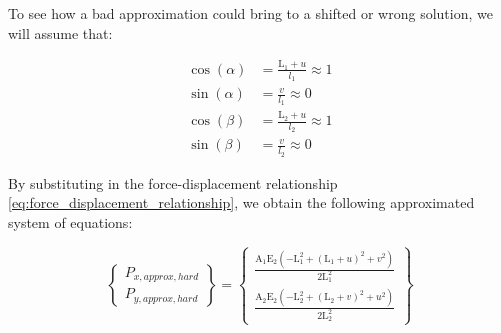To see how a bad approximation could bring to a shifted or wrong solution, we will assume that:

\begin{align}
    \cos(\alpha) & = \frac{\text{L}_1+u}{l_1} \approx 1 \\
    \sin(\alpha) & = \frac{v}{l_1} \approx 0            \\
    \cos(\beta)  & = \frac{\text{L}_2+u}{l_2} \approx 1 \\
    \sin(\beta)  & = \frac{v}{l_2} \approx 0
    \label{eq:trigonometric_approximation_hard}
\end{align}

By substituting in the force-displacement relationship \ref{eq:force_displacement_relationship}, we obtain the following approximated system of equations:

\begin{equation}
    \begin{Bmatrix}
        P_{x,approx,hard} \\
        P_{y,approx,hard}
    \end{Bmatrix}
    =
    \begin{Bmatrix}
        \frac{\text{A}_1 \text{E}_2 \left(-\text{L}_1^2+(\text{L}_1+u)^2+v^2\right)}{2 \text{L}_1^2} \\
        \frac{\text{A}_2 \text{E}_2 \left(-\text{L}_2^2+(\text{L}_2+v)^2+u^2\right)}{2 \text{L}_2^2}
    \end{Bmatrix}
    \label{eq:force_displacement_relationship_approximation_hard}
\end{equation}